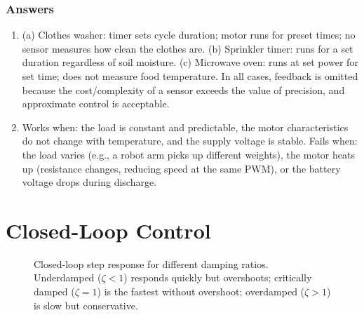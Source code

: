 \documentclass[11pt,letterpaper,twoside,openany]{book}
\begin{document}
\subsection{Answers}
\begin{enumerate}[leftmargin=1.5em]
\item (a) Clothes washer: timer sets cycle duration; motor runs for preset times; no sensor measures how clean the clothes are. (b) Sprinkler timer: runs for a set duration regardless of soil moisture. (c) Microwave oven: runs at set power for set time; does not measure food temperature. In all cases, feedback is omitted because the cost/complexity of a sensor exceeds the value of precision, and approximate control is acceptable.
\item Works when: the load is constant and predictable, the motor characteristics do not change with temperature, and the supply voltage is stable. Fails when: the load varies (e.g., a robot arm picks up different weights), the motor heats up (resistance changes, reducing speed at the same PWM), or the battery voltage drops during discharge.
\end{enumerate}


\chapter{Closed-Loop Control}
\label{ch:closedloop}

\begin{figure}[htbp]
\centering
{}
\caption{Closed-loop step response for different damping ratios. Underdamped ($\zeta < 1$) responds quickly but overshoots; critically damped ($\zeta = 1$) is the fastest without overshoot; overdamped ($\zeta > 1$) is slow but conservative.}
\label{fig:step_damping}
\end{figure}
\end{document}
